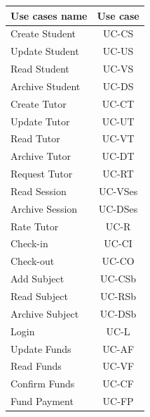 \documentclass[12pt]{article}
\begin{document}
\begin{tabular}{| l | c |}

\hline

\textbf{Use cases name} & \textbf{Use case}	\\ \hline
			Create Student				&	UC-CS
			\\Update Student 			&	UC-US
			\\Read Student      		&	UC-VS
			\\Archive Student		&		UC-DS
			\\Create Tutor			&		UC-CT
			\\Update Tutor			&		UC-UT
			\\Read Tutor				&	UC-VT
			\\Archive Tutor			&		UC-DT
			\\Request Tutor			&		UC-RT
			\\Read Session				&	UC-VSes %
			\\Archive Session			&		UC-DSes %
			\\Rate Tutor				&	UC-R
			\\Check-in				&		UC-CI
			\\Check-out				&		UC-CO
			\\Add Subject			&		UC-CSb %
			\\Read Subject			&		UC-RSb
			\\Archive Subject		&		UC-DSb
			\\Login					&		UC-L
			\\Update Funds				&		UC-AF
			\\Read Funds				&		UC-VF
			\\Confirm Funds			&       UC-CF
			\\Fund Payment			&       UC-FP
			\\ \hline
\end{tabular}
\end{document}
